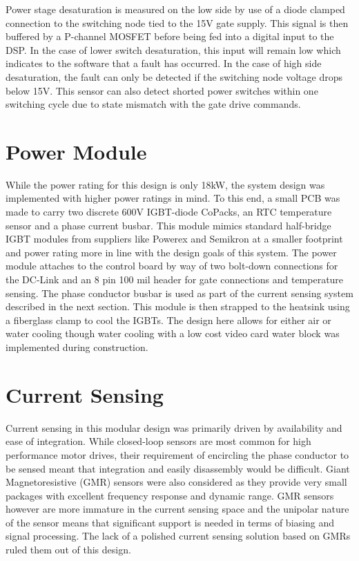 Power stage desaturation is measured on the low side by use of a diode clamped
connection to the switching node tied to the 15V gate supply.
This signal is then buffered by a P-channel MOSFET before being fed into a
digital input to the DSP.
In the case of lower switch desaturation, this input will remain low which
indicates to the software that a fault has occurred.
In the case of high side desaturation, the fault can only be detected if the
switching node voltage drops below 15V.
This sensor can also detect shorted power switches within one switching cycle
due to state mismatch with the gate drive commands.

\section{Power Module}
While the power rating for this design is only 18kW, the system design was
implemented with higher power ratings in mind.
To this end, a small PCB was made to carry two discrete 600V IGBT-diode
CoPacks, an RTC temperature sensor and a phase current busbar.
This module mimics standard half-bridge IGBT modules from suppliers like
Powerex and Semikron at a smaller footprint and power rating more in line with
the design goals of this system.
The power module attaches to the control board by way of two bolt-down
connections for the DC-Link and an 8 pin 100 mil header for gate connections
and temperature sensing.
The phase conductor busbar is used as part of the current sensing system
described in the next section.
This module is then strapped to the heatsink using a fiberglass clamp to cool
the IGBTs.
The design here allows for either air or water cooling though water cooling
with a low cost video card water block was implemented during construction.

\section{Current Sensing}
Current sensing in this modular design was primarily driven by availability
and ease of integration.
While closed-loop sensors are most common for high performance motor drives,
their requirement of encircling the phase conductor to be sensed meant that
integration and easily disassembly would be difficult.
Giant Magnetoresistive (GMR) sensors were also considered as they provide very
small packages with excellent frequency response and dynamic range.
GMR sensors however are more immature in the current sensing space and the
unipolar nature of the sensor means that significant support is needed in
terms of biasing and signal processing.
The lack of a polished current sensing solution based on GMRs ruled them out
of this design.

